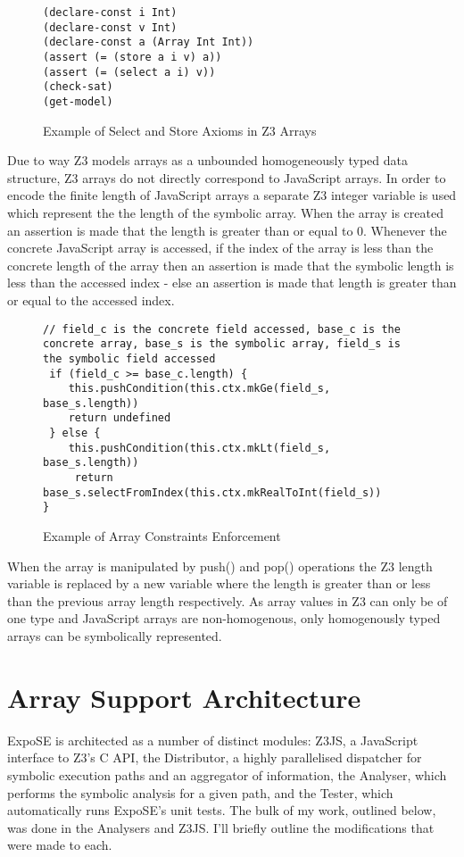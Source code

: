 \documentclass[]{final_report}
\begin{document}
\begin{figure}[t]
\begin{verbatim}
(declare-const i Int)
(declare-const v Int)
(declare-const a (Array Int Int))
(assert (= (store a i v) a))
(assert (= (select a i) v))
(check-sat)
(get-model)
\end{verbatim}
\caption{\label{fig:z3-select-store} Example of Select and Store Axioms in Z3 Arrays}
\end{figure}


Due to way Z3 models arrays as a unbounded homogeneously typed data structure, Z3 arrays do not directly correspond to JavaScript arrays. In order to encode the finite length of JavaScript arrays a separate Z3 integer variable is used which represent the the length of the symbolic array. When the array is created an assertion is made that the length is greater than or equal to 0. Whenever the concrete JavaScript array is accessed, if the index of the array is less than the concrete length of the array then an assertion is made that the symbolic length is less than the accessed index - else an assertion is made that length is greater than or equal to the accessed index.

\begin{figure}[h]
\begin{verbatim}
// field_c is the concrete field accessed, base_c is the concrete array, base_s is the symbolic array, field_s is the symbolic field accessed
 if (field_c >= base_c.length) {
    this.pushCondition(this.ctx.mkGe(field_s, base_s.length))
    return undefined
 } else {
    this.pushCondition(this.ctx.mkLt(field_s, base_s.length))
     return base_s.selectFromIndex(this.ctx.mkRealToInt(field_s))
}
\end{verbatim}
\caption{\label{fig:expose-get-field} Example of Array Constraints Enforcement}
\end{figure}

When the array is manipulated by push() and pop() operations the Z3 length variable is replaced by a new variable where the length is greater than or less than the previous array length respectively. As array values in Z3 can only be of one type and JavaScript arrays are non-homogenous, only homogenously typed arrays can be symbolically represented.

\section{Array Support Architecture}
ExpoSE is architected as a number of distinct modules: Z3JS, a JavaScript interface to Z3’s C API, the Distributor, a highly parallelised dispatcher for symbolic execution paths and an aggregator of information, the Analyser, which performs the symbolic analysis for a given path, and the Tester, which automatically runs ExpoSE’s unit tests. The bulk of my work, outlined below, was done in the Analysers and Z3JS. I’ll briefly outline the modifications that were made to each.
\end{document}
